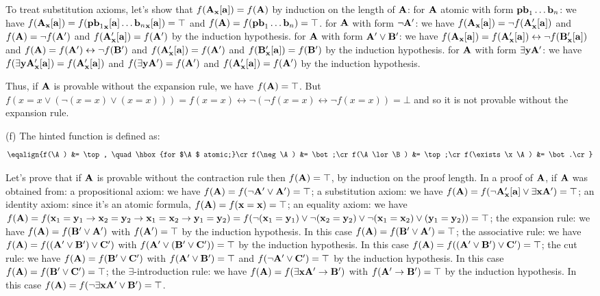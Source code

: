 To treat substitution axioms, let's show that $f({\bf A}_{\bf x}[{\bf a}]) = f({\bf A})$ by induction on the length of ${\bf A}$:
\itemitem{$\bullet$} for ${\bf A}$ atomic with form ${\bf pb}_1 \dots {\bf b}_n$: we have $f({\bf A}_{\bf x}[{\bf a}]) = f({{\bf pb}_1}_{\bf x}[{\bf a}] \dots {{\bf b}_n}_{\bf x}[{\bf a}]) = \top$
and $f({\bf A}) = f({\bf pb}_1 \dots {\bf b}_n) = \top$.
\itemitem{$\bullet$} for ${\bf A}$ with form $\neg {\bf A}'$: we have $f({\bf A}_{\bf x}[{\bf a}]) = \neg f({\bf A}'_{\bf x}[{\bf a}])$
and $f({\bf A}) = \neg f({\bf A}')$ and $f({\bf A}'_{\bf x}[{\bf a}]) = f({\bf A}')$ by the induction hypothesis.
\itemitem{$\bullet$} for ${\bf A}$ with form ${\bf A}' \lor {\bf B}'$: we have $f({\bf A}_{\bf x}[{\bf a}]) = f({\bf A}'_{\bf x}[{\bf a}]) \leftrightarrow \neg f({\bf B}'_{\bf x}[{\bf a}])$
and $f({\bf A}) = f({\bf A}') \leftrightarrow \neg f({\bf B}')$ and $f({\bf A}'_{\bf x}[{\bf a}]) = f({\bf A}')$ and
$f({\bf B}'_{\bf x}[{\bf a}]) = f({\bf B}')$ by the induction hypothesis.
\itemitem{$\bullet$} for ${\bf A}$ with form $\exists {\bf y}{\bf A}'$: we have $f(\exists {\bf y}{\bf A}'_{\bf x}[{\bf a}]) = f({\bf A}'_{\bf x}[{\bf a}])$
and $f(\exists {\bf y}{\bf A}') = f({\bf A}')$ and $f({\bf A}'_{\bf x}[{\bf a}]) = f({\bf A}')$ by the induction hypothesis.

Thus, if ${\bf A}$ is provable without the expansion rule, we have $f({\bf A}) = \top$. 
But $f(x=x \lor (\neg (x=x) \lor (x=x))) = f(x=x) \leftrightarrow \neg (\neg f(x=x) \leftrightarrow \neg f(x=x)) = \bot$ and so it is not provable without the expansion rule.
\smallskip

\ansitem (f)
The hinted function is defined as:
$$\eqalign{f(\A) &= \top, \quad \hbox{for $\A$ atomic;}\cr
f(\neg \A) &= \bot;\cr
f(\A \lor \B) &= \top;\cr
f(\exists \x\A) &= \bot.\cr}$$

Let's prove that if ${\bf A}$ is provable without the contraction rule then $f({\bf A}) = \top$, by induction on the proof length.
In a proof of ${\bf A}$, if ${\bf A}$ was obtained from:
\itemitem{$\bullet$} a propositional axiom: we have $f({\bf A}) = f(\neg {\bf A}' \lor {\bf A}') = \top$;
\itemitem{$\bullet$} a substitution axiom: we have 
$f({\bf A}) = f(\neg {\bf A}'_{\bf x}[{\bf a}] \lor \exists {\bf x}{\bf A}') = \top$;
\itemitem{$\bullet$} an identity axiom: since it's an atomic formula, $f({\bf A}) = f({\bf x} = {\bf x}) = \top$;
\itemitem{$\bullet$} an equality axiom: we have $f({\bf A}) = 
f({\bf x}_1 = {\bf y}_1 \to {\bf x}_2 = {\bf y}_2 \to {\bf x}_1 = {\bf x}_2 \to {\bf y}_1 = {\bf y}_2) =
f(\neg ({\bf x}_1 = {\bf y}_1) \lor \neg ({\bf x}_2 = {\bf y}_2) \lor \neg ({\bf x}_1 = {\bf x}_2) \lor ({\bf y}_1 = {\bf y}_2)) = \top$;
\itemitem{$\bullet$} the expansion rule: we have $f({\bf A}) = f({\bf B}' \lor {\bf A}')$ with $f({\bf A}') = \top$ by the induction hypothesis.
In this case $f({\bf A}) = f({\bf B}' \lor {\bf A}') = \top$;
\itemitem{$\bullet$} the associative rule: we have $f({\bf A}) = f(({\bf A}' \lor {\bf B}') \lor {\bf C}')$ with $f({\bf A}' \lor ({\bf B}' \lor {\bf C}')) = \top$ by the induction hypothesis.
In this case $f({\bf A}) = f(({\bf A}' \lor {\bf B}') \lor {\bf C}') = \top$;
\itemitem{$\bullet$} the cut rule: we have $f({\bf A}) = f({\bf B}' \lor {\bf C}')$ with $f({\bf A}' \lor {\bf B}') = \top$ and $f(\neg {\bf A}' \lor {\bf C}') = \top$ by the induction hypothesis.
In this case $f({\bf A}) = f({\bf B}' \lor {\bf C}') = \top$;
\itemitem{$\bullet$} the $\exists$-introduction rule: we have $f({\bf A}) = f(\exists {\bf x}{\bf A}' \to {\bf B}')$ with $f({\bf A}' \to {\bf B}') = \top$ by the induction hypothesis.
In this case $f({\bf A}) = f(\neg \exists {\bf x}{\bf A}' \lor {\bf B}') = \top$.

